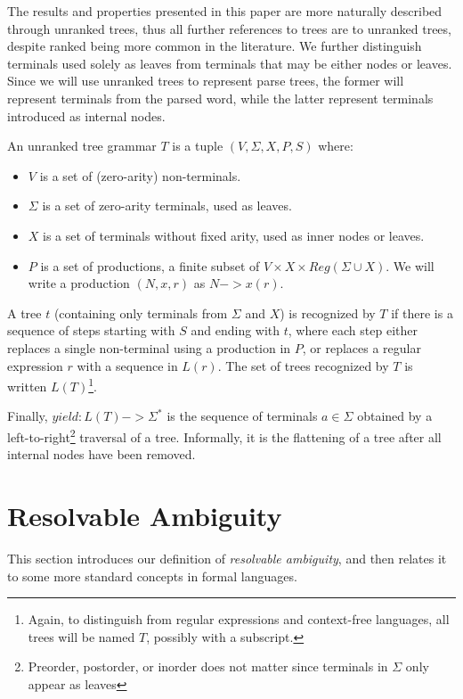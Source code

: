 \documentclass[acmsmall,review,anonymous]{acmart}\settopmatter{printfolios=true,printccs=false,printacmref=false}
\newcommand{\NT}{V} %
\newcommand{\T}{\Sigma} %
\newcommand{\regex}{\mathit{Reg}}
\begin{document}
The results and properties presented in this paper are more naturally described through unranked trees, thus all further references to trees are to unranked trees, despite ranked being more common in the literature. We further distinguish terminals used solely as leaves from terminals that may be either nodes or leaves. Since we will use unranked trees to represent parse trees, the former will represent terminals from the parsed word, while the latter represent terminals introduced as internal nodes.

An unranked tree grammar $T$ is a tuple $(\NT, \T, X, P, S)$ where:

\begin{itemize}
\item $\NT$ is a set of (zero-arity) non-terminals.
\item $\T$ is a set of zero-arity terminals, used as leaves.
\item $X$ is a set of terminals without fixed arity, used as inner nodes or leaves.
\item $P$ is a set of productions, a finite subset of $\NT \times X \times \regex(\T \cup X)$. We will write a production $(N, x, r)$ as $N -> x(r)$.
\end{itemize}

\noindent A tree $t$ (containing only terminals from $\T$ and $X$) is recognized by $T$ if there is a sequence of steps starting with $S$ and ending with $t$, where each step either replaces a single non-terminal using a production in $P$, or replaces a regular expression $r$ with a sequence in $L(r)$. The set of trees recognized by $T$ is written $L(T)$\footnote{Again, to distinguish from regular expressions and context-free languages, all trees will be named $T$, possibly with a subscript.}.

Finally, $yield : L(T) -> \T^{*}$ is the sequence of terminals $a \in \T$ obtained by a left-to-right\footnote{Preorder, postorder, or inorder does not matter since terminals in $\T$ only appear as leaves} traversal of a tree. Informally, it is the flattening of a tree after all internal nodes have been removed.

\section{Resolvable Ambiguity} \label{sec:resolvable-definition}

This section introduces our definition of \emph{resolvable ambiguity}, and then relates it to some more standard concepts in formal languages.
\end{document}
